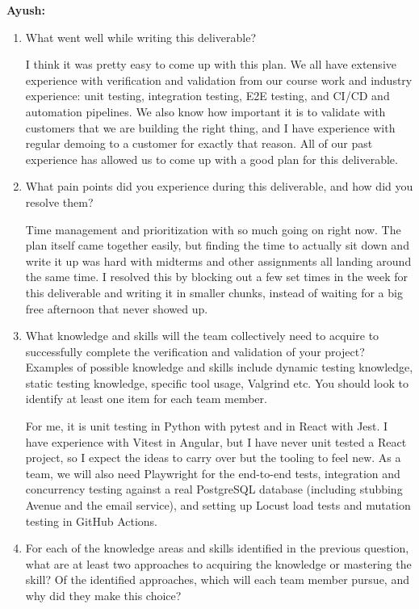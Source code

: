 \documentclass[12pt, titlepage]{article}
\begin{document}
\textbf{Ayush:}
\begin{enumerate}
  \item What went well while writing this deliverable?

  I think it was pretty easy to come up with this plan. We all have extensive experience
  with verification and validation from our course work and industry experience: unit
  testing, integration testing, E2E testing, and CI/CD and automation pipelines. We also
  know how important it is to validate with customers that we are building the right
  thing, and I have experience with regular demoing to a customer for exactly that reason.
  All of our past experience has allowed us to come up with a good plan for this
  deliverable.

  \item What pain points did you experience during this deliverable, and how
    did you resolve them?

  Time management and prioritization with so much going on right now. The plan itself came
  together easily, but finding the time to actually sit down and write it up was hard with
  midterms and other assignments all landing around the same time. I resolved this by
  blocking out a few set times in the week for this deliverable and writing it in smaller
  chunks, instead of waiting for a big free afternoon that never showed up.

  \item What knowledge and skills will the team collectively need to acquire to
  successfully complete the verification and validation of your project?
  Examples of possible knowledge and skills include dynamic testing knowledge,
  static testing knowledge, specific tool usage, Valgrind etc.  You should look to
  identify at least one item for each team member.

  For me, it is unit testing in Python with pytest and in React with Jest. I have
  experience with Vitest in Angular, but I have never unit tested a React project, so I
  expect the ideas to carry over but the tooling to feel new. As a team, we will also need
  Playwright for the end-to-end tests, integration and concurrency testing against a real
  PostgreSQL database (including stubbing Avenue and the email service), and setting up
  Locust load tests and mutation testing in GitHub Actions.

  \item For each of the knowledge areas and skills identified in the previous
  question, what are at least two approaches to acquiring the knowledge or
  mastering the skill?  Of the identified approaches, which will each team
  member pursue, and why did they make this choice?


\end{enumerate}
\end{document}
